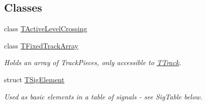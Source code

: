 \subsection*{Classes}
\begin{DoxyCompactItemize}
\item 
class \mbox{\hyperlink{class_t_track_1_1_t_active_level_crossing}{T\+Active\+Level\+Crossing}}
\item 
class \mbox{\hyperlink{class_t_track_1_1_t_fixed_track_array}{T\+Fixed\+Track\+Array}}
\begin{DoxyCompactList}\small\item\em Holds an array of Track\+Pieces, only accessible to \mbox{\hyperlink{class_t_track}{T\+Track}}. \end{DoxyCompactList}\item 
struct \mbox{\hyperlink{struct_t_track_1_1_t_sig_element}{T\+Sig\+Element}}
\begin{DoxyCompactList}\small\item\em Used as basic elements in a table of signals -\/ see Sig\+Table below. \end{DoxyCompactList}\end{DoxyCompactItemize}
